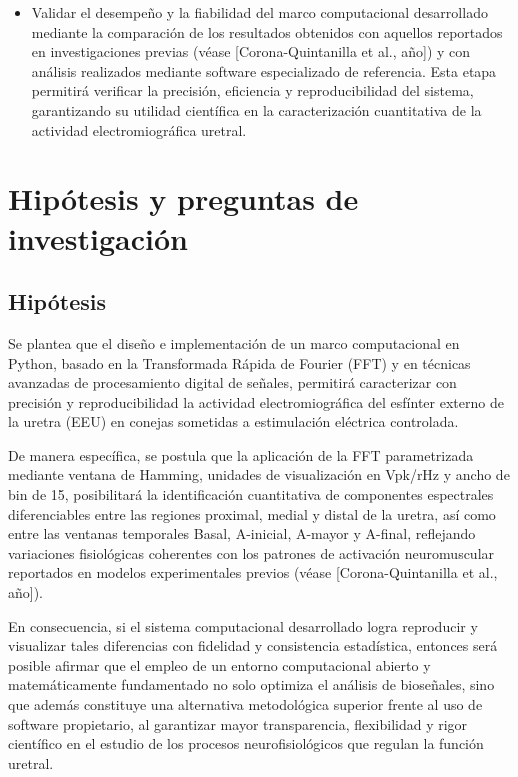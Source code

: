\begin{itemize}
	\item Validar el desempeño y la fiabilidad del marco computacional desarrollado mediante la comparación de los resultados obtenidos con aquellos reportados en investigaciones previas (véase [Corona-Quintanilla et al., año]) y con análisis realizados mediante software especializado de referencia. Esta etapa permitirá verificar la precisión, eficiencia y reproducibilidad del sistema, garantizando su utilidad científica en la caracterización cuantitativa de la actividad electromiográfica uretral.
	
\end{itemize}

\section{Hipótesis y preguntas de investigación}

\subsection{Hipótesis}

\noindent Se plantea que el diseño e implementación de un marco computacional en Python, basado en la Transformada Rápida de Fourier (FFT) y en técnicas avanzadas de procesamiento digital de señales, permitirá caracterizar con precisión y reproducibilidad la actividad electromiográfica del esfínter externo de la uretra (EEU) en conejas sometidas a estimulación eléctrica controlada.

\noindent De manera específica, se postula que la aplicación de la FFT parametrizada mediante ventana de Hamming, unidades de visualización en Vpk/rHz y ancho de bin de 15, posibilitará la identificación cuantitativa de componentes espectrales diferenciables entre las regiones proximal, medial y distal de la uretra, así como entre las ventanas temporales Basal, A-inicial, A-mayor y A-final, reflejando variaciones fisiológicas coherentes con los patrones de activación neuromuscular reportados en modelos experimentales previos (véase [Corona-Quintanilla et al., año]).

\noindent En consecuencia, si el sistema computacional desarrollado logra reproducir y visualizar tales diferencias con fidelidad y consistencia estadística, entonces será posible afirmar que el empleo de un entorno computacional abierto y matemáticamente fundamentado no solo optimiza el análisis de bioseñales, sino que además constituye una alternativa metodológica superior frente al uso de software propietario, al garantizar mayor transparencia, flexibilidad y rigor científico en el estudio de los procesos neurofisiológicos que regulan la función uretral.

